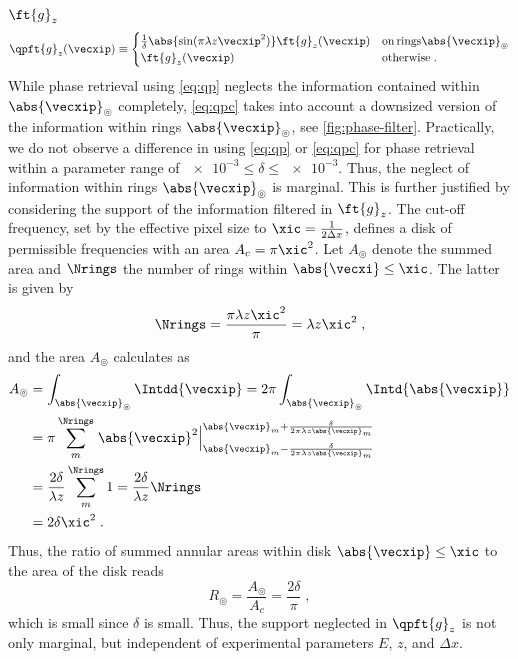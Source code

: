 \documentclass[
twoside,
openright,
titlepage,
numbers=noenddot,
headinclude,
fleqn,
a4paper,
footinclude=true,
cleardoublepage=empty,
abstractoff,
BCOR=5mm,
paper=a4,
fontsize=11pt,
british,ngerman,american,
]{scrreprt}
\begin{document}
$\ft{g}_z$
\begin{equation}
  \label{eq:qpc}
  \qpft{g}_z(\vecxip) \equiv
  \begin{cases} 
    \frac{1}{\delta}\abs{\sin(\pi\lambda z\vecxip^2)} 
    \ft{g}_z(\vecxip)
    & \mathrm{on\,rings}\abs{\vecxip}_\circledcirc
    \\ \ft{g}_z(\vecxip) & \mathrm{otherwise } \;.
  \end{cases}
\end{equation}
While phase retrieval using \cref{eq:qp} neglects the information
contained within $\abs{\vecxip}_\circledcirc$ completely,
\cref{eq:qpc} takes into account a downsized version of the
information within rings $\abs{\vecxip}_\circledcirc$, see
\cref{fig:phase-filter}.  Practically, we do not observe a difference
in using \cref{eq:qp} or \cref{eq:qpc} for phase retrieval within a
parameter range of $\num{e-3}\le\delta\le\num{e-3}$.  Thus, the
neglect of information within rings $\abs{\vecxip}_\circledcirc$ is
marginal.  This is further justified by considering the support of the
 information filtered in $\ft{g}_z$.  The cut-off frequency, set by the
effective pixel size to $\xic=\frac{1}{2\Delta x}$, defines a disk of
permissible frequencies with an area $A_c=\pi\xic^2$.  Let
$A_{\circledcirc}$ denote the summed area and $\Nrings$ the number of
rings within $\abs{\vecxi}\le\xic$.  The latter is given by
\begin{equation}
  \label{eq:number-of-rings}
  \Nrings = \frac{\pi\lambda z \xic^2}{\pi} 
  = \lambda z \xic^2 \;,
\end{equation}
and the area $A_{\circledcirc}$ calculates as
\begin{equation}
  \label{eq:rings-area-0}
  \begin{split}
      A_{\circledcirc} & = \int_{\abs{\vecxip}_\circledcirc}\Intdd{\vecxip}
        = 2\pi %
      \int_{\abs{\vecxip}_\circledcirc}\Intd{\abs{\vecxip}}
      \\ & = \pi \sum_m^{\Nrings} \left.\abs{\vecxip}^2\right|
      _{\abs{\vecxip}_m-\frac{\delta}{2\pi\lambda z\abs{\vecxip}_m}}
      ^{\abs{\vecxip}_m+\frac{\delta}{2\pi\lambda z\abs{\vecxip}_m}} 
      \\ & = \frac{2\delta}{\lambda z} \sum_m^{\Nrings} 1
      = \frac{2\delta}{\lambda z} \Nrings
      \\ &  = 2\delta \xic^2 \;.
  \end{split}
\end{equation}
Thus, the ratio of summed annular areas within disk
$\abs{\vecxip}\le\xic$ to the area of the disk reads
\begin{equation}
  \label{eq:filtered-area-ratio}
  R_{\circledcirc} = \frac{A_{\circledcirc}}{A_c} 
  = \frac{2\delta}{\pi} \;,
\end{equation}
which is small since $\delta$ is small.  Thus, the support neglected
in $\qpft{g}_z$ is not only marginal, but independent of experimental
parameters $E$, $z$, and $\Delta x$.  
\end{document}
